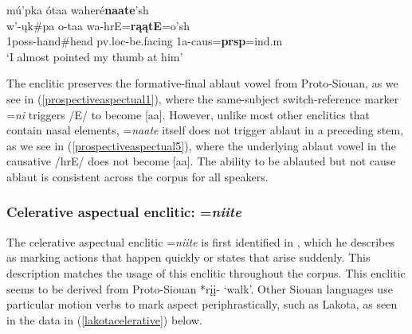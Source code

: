 \begin{exe}
\begin{xlist}
	\item\label{prospectiveaspectual5}
	\glll	mú'pka ótaa waheré\textbf{naate}'sh\\
	w'-ųk\#pa o-taa wa-hrE=\textbf{rąątE}=o'sh\\
	1poss-\textnormal{hand}\#\textnormal{head} pv.loc-\textnormal{be.facing} 1a-caus=\textbf{prsp}=ind.m\\
	\glt `I almost pointed my thumb at him' \citep[133]{hollow1973b}

	\end{xlist}


\end{exe}

The enclitic preserves the formative-final ablaut vowel from Proto-Siouan, as we see in (\ref{prospectiveaspectual1}), where the same-subject switch-reference marker =\textit{ni} triggers /E/ to become [aa]. However, unlike most other enclitics that contain nasal elements, =\textit{naate} itself does not trigger ablaut in a preceding stem, as we see in (\ref{prospectiveaspectual5}), where the underlying ablaut vowel in the causative /hrE/ does not become [aa]. The ability to be ablauted but not cause ablaut is consistent across the corpus for all speakers.

\subsubsection{Celerative aspectual enclitic: =\textit{niite}}

The celerative aspectual enclitic =\textit{niite} is first identified in \citet[30]{hollow1973a}, which he describes as marking actions that happen quickly or states that arise suddenly. This description matches the usage of this enclitic throughout the corpus. This enclitic seems to be derived from Proto-Siouan *rįį- `walk'. Other Siouan languages use particular motion verbs to mark aspect periphrastically, such as Lakota, as seen in the data in (\ref{lakotacelerative}) below.

